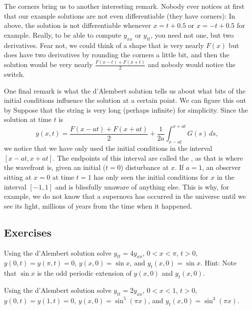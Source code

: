 \medskip

The corners bring us to another interesting remark.  Nobody ever notices at first
that our example solutions are not even differentiable (they have corners):
In  above, the solution is not
differentiable whenever $x=t+0.5$ or $x=-t+0.5$ for example.
Really, to be able to compute $y_{xx}$ or $y_{tt}$, you need not one, but two
derivatives.  Fear not, we could think of a shape that is very nearly
$F(x)$ but does have two derivatives by rounding the corners a little bit,
and then the solution would be very nearly
$\frac{F(x-t)+F(x+t)}{2}$ and nobody would notice the switch.

\medskip

One final remark is what the d'Alembert solution tells us about what
bits of the initial conditions influence the solution at a certain point.
We can figure this out by   Suppose that the string is very long (perhaps
infinite) for simplicity.  Since the solution at time $t$ is
\begin{equation*}
y(x,t) =
\frac{F(x-at) + F(x+at)}{2} + \frac{1}{2a} \int_{x-at}^{x+at} G(s) \,ds ,
\end{equation*}
we notice that we have only used the initial conditions in the interval
$[x-at,x+at]$.  The endpoints of this interval are called the
\emph{}, as that is where the wavefront is, given an
initial ($t=0$) disturbance at $x$.
If $a=1$, an observer sitting at $x=0$ at time $t=1$ has only seen the
initial conditions for $x$ in the interval $[-1,1]$
and is blissfully unaware of anything else.
This is why, for example, we do not know that a supernova has occurred in the
universe until we see its light, millions of years from the time
when it happened.

\subsection{Exercises}

\begin{exercise}
Using the d'Alembert solution solve $y_{tt} = 4y_{xx}$, $0 < x < \pi$, $t >
0$,
$y(0,t) = y(\pi, t) = 0$, $y(x,0) = \sin x$, and
$y_t(x,0) = \sin x$.  Hint: Note that $\sin x$ is the odd periodic extension of
$y(x,0)$ and $y_t(x,0)$.
\end{exercise}

\begin{exercise}
Using the d'Alembert solution solve $y_{tt} = 2y_{xx}$, $0 < x < 1$, $t > 0$,
$y(0,t) = y(1, t) = 0$, $y(x,0) = \sin^5 (\pi x)$, and
$y_t(x,0) = \sin^3 (\pi x)$.
\end{exercise}

